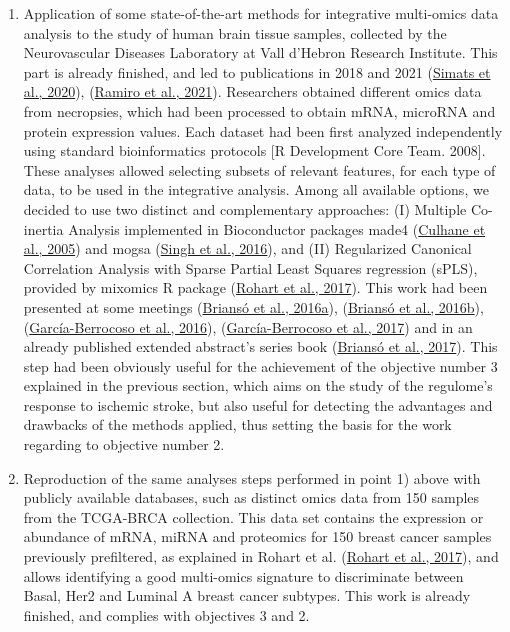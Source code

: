 \documentclass[a4paper, nobind]{templates/ociamthesis}
\begin{document}
\begin{enumerate}
\def\labelenumi{\arabic{enumi}.}
\item
  Application of some state-of-the-art methods for integrative multi-omics data analysis to the study of human brain tissue samples, collected by the Neurovascular Diseases Laboratory at Vall d'Hebron Research Institute. This part is already finished, and led to publications in 2018 and 2021 (\protect\hyperlink{ref-simats_mouse_2020}{Simats et al., 2020}), (\protect\hyperlink{ref-ramiro_integrative_2021}{Ramiro et al., 2021}). Researchers obtained different omics data from necropsies, which had been processed to obtain mRNA, microRNA and protein expression values. Each dataset had been first analyzed independently using standard bioinformatics protocols {[}R Development Core Team. 2008{]}. These analyses allowed selecting subsets of relevant features, for each type of data, to be used in the integrative analysis. Among all available options, we decided to use two distinct and complementary approaches: (I) Multiple Co-inertia Analysis implemented in Bioconductor packages made4 (\protect\hyperlink{ref-culhane_made4_2005}{Culhane et al., 2005}) and mogsa (\protect\hyperlink{ref-singh_diablo_2016}{Singh et al., 2016}), and (II) Regularized Canonical Correlation Analysis with Sparse Partial Least Squares regression (sPLS), provided by mixomics R package (\protect\hyperlink{ref-rohart_mixomics_2017}{Rohart et al., 2017}). This work had been presented at some meetings (\protect\hyperlink{ref-brianso_ibc_2016}{Briansó et al., 2016a}), (\protect\hyperlink{ref-brianso_eccb_2016}{Briansó et al., 2016b}), (\protect\hyperlink{ref-garcia-berrocoso_scb_2016}{García-Berrocoso et al., 2016}), (\protect\hyperlink{ref-garcia-berrocoso_scbf_2017}{García-Berrocoso et al., 2017}) and in an already published extended abstract's series book (\protect\hyperlink{ref-brianso_integrative_2017}{Briansó et al., 2017}). This step had been obviously useful for the achievement of the objective number 3 explained in the previous section, which aims on the study of the regulome's response to ischemic stroke, but also useful for detecting the advantages and drawbacks of the methods applied, thus setting the basis for the work regarding to objective number 2.
\item
  Reproduction of the same analyses steps performed in point 1) above with publicly available databases, such as distinct omics data from 150 samples from the TCGA-BRCA collection. This data set contains the expression or abundance of mRNA, miRNA and proteomics for 150 breast cancer samples previously prefiltered, as explained in Rohart et al. (\protect\hyperlink{ref-rohart_mixomics_2017}{Rohart et al., 2017}), and allows identifying a good multi-omics signature to discriminate between Basal, Her2 and Luminal A breast cancer subtypes. This work is already finished, and complies with objectives 3 and 2.

\end{enumerate}
\end{document}
